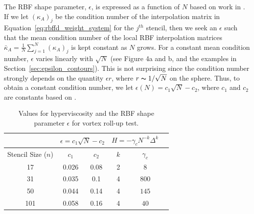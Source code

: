 \documentclass{report}
\begin{document}
The RBF shape parameter, $\epsilon$, is expressed as a function of $N$ based on work in \cite{FlyerLehto11}. If we let $(\kappa_A)_j$ be the condition number of the interpolation matrix in Equation~\ref{eq:rbffd_weight_system} for the $j^{th}$ stencil, then we seek an $\epsilon$ such that the mean condition number of the local RBF interpolation matrices $\bar{\kappa}_A = \frac{1}{N}\sum_{j=1}^N (\kappa_A)_j$ is kept constant as $N$ grows. For a constant mean condition number, $\epsilon$ varies linearly with $\sqrt{N}$ (see \cite{FlyerLehto11} Figure 4a and b, and the examples in Section~\ref{sec:epsilon_contours}). This is not surprising since the condition number strongly depends on the quantity $\epsilon r$, where $r\thicksim1/\sqrt{N}$ on the sphere. Thus, to obtain a constant condition number, we let $\epsilon (N) = c_1 \sqrt{N} - c_2$, where $c_1$ and $c_2$ are constants based on \cite{FlyerLehto11}.

\begin{table}[t]
\begin{center}
\caption{Values for hyperviscosity and the RBF shape parameter $\epsilon$ for vortex roll-up test.}
\label{tbl:vortex_hv_params}
\begin{tabular}{|c|c|c|c|c|c|}
\hline		     & \multicolumn{2}{c|}{$\epsilon = c_1 \sqrt{N} - c_2$} & \multicolumn{2}{c|}{$H = -\gamma_{c} N^{-k} \Delta^{k}$ } \\ \hline
Stencil Size ($n$) & $c_{1}$ & $c_{2}$ & $k$ & $\gamma_c$ \\ \hline
17 & 0.026 & 0.08 & 2 & $8$ \\
31 & 0.035 & 0.1  & 4 & $800$ \\
50 & 0.044 & 0.14 & 4 & $145$ \\
101 & 0.058 & 0.16 & 4 & $40$ \\ \hline
\end{tabular}
\end{center}
\end{table}
\end{document}
